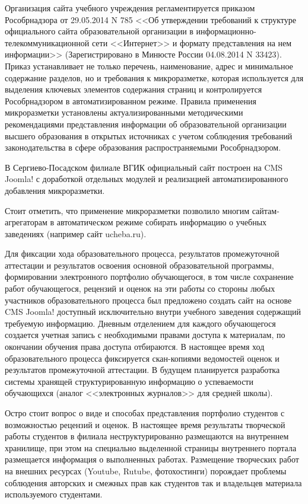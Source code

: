 \documentclass[10pt, a5paper]{article}
\begin{document}
Организация сайта учебного учреждения регламентируется приказом Рособрнадзора от 29.05.2014 N 785 <<Об утверждении требований к структуре официального сайта образовательной организации в информационно-телекоммуникационной сети <<Интернет>> и формату представления на нем информации>> (Зарегистрировано в Минюсте России 04.08.2014 N 33423). Приказ устанавливает не только перечень, наименование, адрес и минимальное содержание разделов, но и требования к микроразметке, которая используется для выделения ключевых элементов содержания страниц и контролируется Рособрнадзором в автоматизированном режиме. Правила применения микроразметки установлены актуализированными методическими рекомендациями представления информации об образовательной организации высшего образования в открытых источниках с учетом соблюдения требований законодательства в сфере образования распространяемыми Рособрнадзором.

В Сергиево-Посадском филиале ВГИК официальный сайт построен на CMS Joomla! с доработкой отдельных модулей и реализацией автоматизированного добавления микроразметки.

Стоит отметить, что применение микроразметки позволило многим сайтам-агрегаторам в автоматическом режиме собирать информацию о учебных заведениях (например сайт ucheba.ru).

Для фиксации хода образовательного процесса, результатов промежуточной аттестации и результатов освоения основной образовательной программы, формировании электронного портфолио обучающегося, в том числе сохранение работ обучающегося, рецензий и оценок на эти работы со стороны любых участников образовательного процесса был предложено создать сайт на основе CMS Joomla! доступный исключительно внутри учебного заведения содержащий требуемую информацию. Дневным отделением для каждого обучающегося создается учетная запись с необходимыми правами доступа к материалам, по окончании обучения права доступа отбираются. В настоящее время ход образовательного процесса фиксируется скан-копиями ведомостей оценок и результатов промежуточной аттестации. В будущем планируется разработка системы хранящей структурированную информацию о успеваемости обучающихся (аналог <<электронных журналов>> для средней школы).

Остро стоит вопрос о виде и способах представления портфолио студентов с возможностью рецензий и оценок. В настоящее время результаты творческой работы студентов в филиала неструктурированно размещаются на внутреннем хранилище, при этом на специально выделенной страницы внутреннего портала размещается информация о выполненных работах. Размещение творческих работ на внешних ресурсах (Youtube, Rutube, фотохостинги) порождает проблемы соблюдения авторских и смежных прав как студентов так и владельцев материала используемого студентами.
\end{document}
